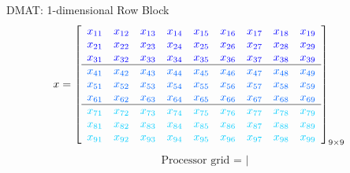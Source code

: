 \begin{frame}
\begin{exampleblock}{DMAT:  1-dimensional Row Block}
\begin{align*}
x &= \left[
      \begin{array}{lllllllll}
      \color{g11}x_{11} & \color{g11}x_{12} & \color{g11}x_{13} & 
\color{g11}x_{14} & \color{g11}x_{15} & \color{g11}x_{16} & \color{g11}x_{17} & 
\color{g11}x_{18} & \color{g11}x_{19}\\
      \color{g11}x_{21} & \color{g11}x_{22} & \color{g11}x_{23} & 
\color{g11}x_{24} & \color{g11}x_{25} & \color{g11}x_{26} & \color{g11}x_{27} & 
\color{g11}x_{28} & \color{g11}x_{29}\\
      \color{g11}x_{31} & \color{g11}x_{32} & \color{g11}x_{33} & 
\color{g11}x_{34} & \color{g11}x_{35} & \color{g11}x_{36} & \color{g11}x_{37} & 
\color{g11}x_{38} & \color{g11}x_{39}\\\hline
      \color{g12}x_{41} & \color{g12}x_{42} & \color{g12}x_{43} & 
\color{g12}x_{44} & \color{g12}x_{45} & \color{g12}x_{46} & \color{g12}x_{47} & 
\color{g12}x_{48} & \color{g12}x_{49}\\
      \color{g12}x_{51} & \color{g12}x_{52} & \color{g12}x_{53} & 
\color{g12}x_{54} & \color{g12}x_{55} & \color{g12}x_{56} & \color{g12}x_{57} & 
\color{g12}x_{58} & \color{g12}x_{59}\\
      \color{g12}x_{61} & \color{g12}x_{62} & \color{g12}x_{63} & 
\color{g12}x_{64} & \color{g12}x_{65} & \color{g12}x_{66} & \color{g12}x_{67} & 
\color{g12}x_{68} & \color{g12}x_{69}\\\hline
      \color{g13}x_{71} & \color{g13}x_{72} & \color{g13}x_{73} & 
\color{g13}x_{74} & \color{g13}x_{75} & \color{g13}x_{76} & \color{g13}x_{77} & 
\color{g13}x_{78} & \color{g13}x_{79}\\
      \color{g13}x_{81} & \color{g13}x_{82} & \color{g13}x_{83} & 
\color{g13}x_{84} & \color{g13}x_{85} & \color{g13}x_{86} & \color{g13}x_{87} & 
\color{g13}x_{88} & \color{g13}x_{89}\\
      \color{g13}x_{91} & \color{g13}x_{92} & \color{g13}x_{93} & 
\color{g13}x_{94} & \color{g13}x_{95} & \color{g13}x_{96} & \color{g13}x_{97} & 
\color{g13}x_{98} & \color{g13}x_{99}\\
      \end{array}
\right]_{9\times 9}
\end{align*}
\vspace{-.6cm}
\begin{align*}
\text{Processor grid = }\left|

\end{align*}
\end{exampleblock}
\end{frame}
